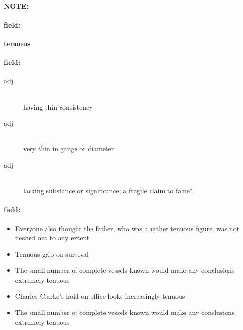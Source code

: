 \documentclass[12pt]{article}
\newenvironment{note}{\paragraph{NOTE:}}{}
\newenvironment{field}{\paragraph{field:}}{}
\begin{document}
\begin{note}
\begin{field}
\textbf{\large tenuous}
\end{field}


\begin{field}
\begin{description}
\item[adj] \hfill \\ 
having thin consistency

\item[adj] \hfill \\ 
very thin in gauge or diameter

\item[adj] \hfill \\ 
lacking substance or significance; a fragile claim to fame"

\end{description}
\end{field}

\begin{field}
\begin{itemize}
\item Everyone also thought the father, who was a rather tenuous figure, was not fleshed out to any extent
\item Tenuous grip on survival
\item The small number of complete vessels known would make any conclusions extremely tenuous
\item Charles Clarke's hold on office looks increasingly tenuous
\item The small number of complete vessels known would make any conclusions extremely tenuous
\end{itemize}
\end{field}
\end{note}
\end{document}
